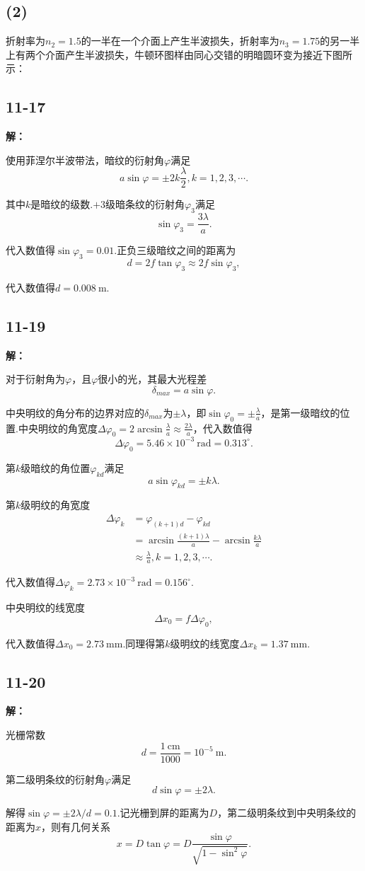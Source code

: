 \documentclass[twocolumn]{ctexart}
\newcommand{\sol}[1]{\subsection*{#1}\noindent\textbf{解：}
	
}
\newcommand{\un}[1]{\ \mathrm{#1}}
\begin{document}
\subsection*{(2)}
折射率为$n_2=1.5$的一半在一个介面上产生半波损失，折射率为$n_3=1.75$的另一半上有两个介面产生半波损失，牛顿环图样由同心交错的明暗圆环变为接近下图所示：

\sol{11-17}
使用菲涅尔半波带法，暗纹的衍射角$\varphi$满足
$$a\sin\varphi=\pm2k\frac{\lambda}{2},k=1,2,3,\cdots.$$

其中$k$是暗纹的级数.$+3$级暗条纹的衍射角$\varphi_3$满足
$$\sin\varphi_3=\frac{3\lambda}{a}.$$

代入数值得$\sin\varphi_3=0.01$.正负三级暗纹之间的距离为
$$d=2f\tan\varphi_3\approx2f\sin\varphi_3,$$

代入数值得$d=0.008\un m$.

\sol{11-19}
对于衍射角为$\varphi$，且$\varphi$很小的光，其最大光程差
$$\delta_{max}=a\sin\varphi.$$

中央明纹的角分布的边界对应的$\delta_{max}$为$\pm\lambda$，即$\sin\varphi_0=\pm\frac{\lambda}{a}$，是第一级暗纹的位置.中央明纹的角宽度$\Delta\varphi_0=2\arcsin\frac{\lambda}{a}\approx\frac{2\lambda}{a}$，代入数值得
$$\Delta\varphi_0=5.46\times10^{-3}\un{rad}=0.313^\circ{}.$$

第$k$级暗纹的角位置$\varphi_{kd}$满足
$$a\sin\varphi_{kd}=\pm k\lambda.$$

第$k$级明纹的角宽度
\begin{align*}
\Delta\varphi_k&=\varphi_{(k+1)d}-\varphi_{kd}\\
&=\arcsin\frac{(k+1)\lambda}{a}-\arcsin\frac{k\lambda}{a}\\
&\approx\frac{\lambda}{a},k=1,2,3,\cdots.
\end{align*}

代入数值得$\Delta\varphi_k=2.73\times10^{-3}\un{rad}=0.156^\circ{}$.

中央明纹的线宽度
$$\Delta x_0=f\Delta\varphi_0,$$

代入数值得$\Delta x_0=2.73\un{mm}$.同理得第$k$级明纹的线宽度$\Delta x_k=1.37\un{mm}$.

\sol{11-20}
光栅常数
$$d=\frac{1\un{cm}}{1000}=10^{-5}\un m.$$

第二级明条纹的衍射角$\varphi$满足
$$d\sin\varphi=\pm2\lambda.$$

解得$\sin\varphi=\pm2\lambda/d=0.1$.记光栅到屏的距离为$D$，第二级明条纹到中央明条纹的距离为$x$，则有几何关系
$$x=D\tan\varphi=D\frac{\sin\varphi}{\sqrt{1-\sin^2\varphi}}.$$
\end{document}
